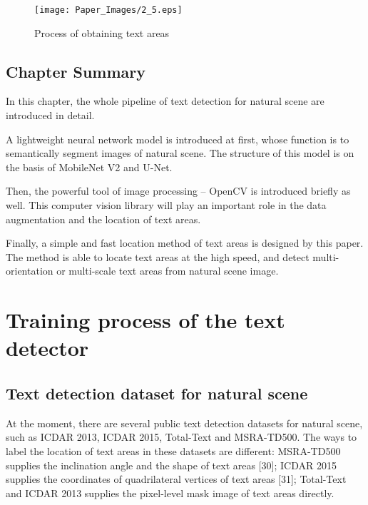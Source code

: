 \documentclass[22pt, UTF8]{article}
\numberwithin{figure}{section}
\numberwithin{table}{section}
\numberwithin{equation}{section} %
\begin{document}
\begin{figure}[H]
    \centering
    \texttt{[image: Paper\_Images/2\_5.eps]}
    \vspace{-3mm} %
    \caption{Process of obtaining text areas}
    \vspace{-4mm} %
\end{figure}

\subsection{Chapter Summary}

\setlength\parindent{2em} In this chapter, the whole pipeline of text detection for natural scene are introduced in detail. 

\setlength\parindent{2em} A lightweight neural network model is introduced at first, whose function is to semantically segment images of natural scene. The structure of this model is on the basis of MobileNet V2 and U-Net.

\setlength\parindent{2em} Then, the powerful tool of image processing -- OpenCV is introduced briefly as well. This computer vision library will play an important role in the data augmentation and the location of text areas.

\setlength\parindent{2em} Finally, a simple and fast location method of text areas is designed by this paper. The method is able to locate text areas at the high speed, and detect multi-orientation or multi-scale text areas from natural scene image.

\newpage

\section{Training process of the text detector}

\subsection{Text detection dataset for natural scene}

\setlength\parindent{2em} At the moment, there are several public text detection datasets for natural scene, such as ICDAR 2013, ICDAR 2015, Total-Text and MSRA-TD500. The ways to label the location of text areas in these datasets are different: MSRA-TD500 supplies the inclination angle and the shape of text areas [30]; ICDAR 2015 supplies the coordinates of quadrilateral vertices of text areas [31]; Total-Text and ICDAR 2013 supplies the pixel-level mask image of text areas directly.
\end{document}
